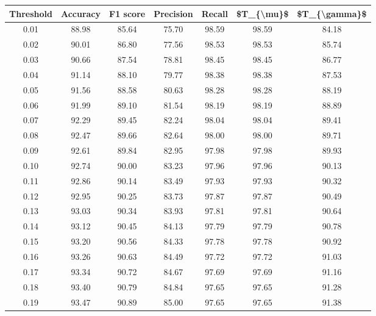 \begin{tabular}{|c|c|c|c|c|c|c|}
\hline
 Threshold &  Accuracy &  F1 score &  Precision &  Recall &  \$T\_\{\textbackslash mu\}\$ &  \$T\_\{\textbackslash gamma\}\$ \\
\hline
      0.01 &     88.98 &     85.64 &      75.70 &   98.59 &      98.59 &         84.18 \\
      0.02 &     90.01 &     86.80 &      77.56 &   98.53 &      98.53 &         85.74 \\
      0.03 &     90.66 &     87.54 &      78.81 &   98.45 &      98.45 &         86.77 \\
      0.04 &     91.14 &     88.10 &      79.77 &   98.38 &      98.38 &         87.53 \\
      0.05 &     91.56 &     88.58 &      80.63 &   98.28 &      98.28 &         88.19 \\
      0.06 &     91.99 &     89.10 &      81.54 &   98.19 &      98.19 &         88.89 \\
      0.07 &     92.29 &     89.45 &      82.24 &   98.04 &      98.04 &         89.41 \\
      0.08 &     92.47 &     89.66 &      82.64 &   98.00 &      98.00 &         89.71 \\
      0.09 &     92.61 &     89.84 &      82.95 &   97.98 &      97.98 &         89.93 \\
      0.10 &     92.74 &     90.00 &      83.23 &   97.96 &      97.96 &         90.13 \\
      0.11 &     92.86 &     90.14 &      83.49 &   97.93 &      97.93 &         90.32 \\
      0.12 &     92.95 &     90.25 &      83.73 &   97.87 &      97.87 &         90.49 \\
      0.13 &     93.03 &     90.34 &      83.93 &   97.81 &      97.81 &         90.64 \\
      0.14 &     93.12 &     90.45 &      84.13 &   97.79 &      97.79 &         90.78 \\
      0.15 &     93.20 &     90.56 &      84.33 &   97.78 &      97.78 &         90.92 \\
      0.16 &     93.26 &     90.63 &      84.49 &   97.72 &      97.72 &         91.03 \\
      0.17 &     93.34 &     90.72 &      84.67 &   97.69 &      97.69 &         91.16 \\
      0.18 &     93.40 &     90.79 &      84.84 &   97.65 &      97.65 &         91.28 \\
      0.19 &     93.47 &     90.89 &      85.00 &   97.65 &      97.65 &         91.38 \\

\end{tabular}
